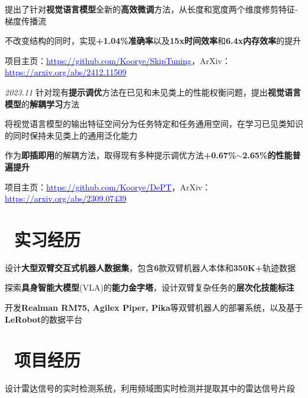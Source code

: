 \documentclass{resume}
\begin{document}
\faAngleRight 提出了针对\textbf{视觉语言模型}全新的\textbf{高效微调}方法，从长度和宽度两个维度修剪特征-梯度传播流

\faAngleRight 不改变结构的同时，实现\textbf{+1.04\%准确率}以及\textbf{15x时间效率}和\textbf{6.4x内存效率}的提升

\faAngleRight 项目主页：\href{https://github.com/Koorye/SkipTuning}{\textcolor{blue}{\sffamily https://github.com/Koorye/SkipTuning}}，ArXiv：\href{https://arxiv.org/abs/2412.11509}{\textcolor{blue}{\sffamily https://arxiv.org/abs/2412.11509}}

\vspace{5pt}
{\textit{2023.11}}
\faAngleRight 针对现有\textbf{提示调优}方法在已见和未见类上的性能权衡问题，提出\textbf{视觉语言模型}的\textbf{解耦学习}方法

\faAngleRight 将视觉语言模型的输出特征空间分为任务特定和任务通用空间，在学习已见类知识的同时保持未见类上的通用泛化能力

\faAngleRight 作为\textbf{即插即用}的解耦方法，取得现有多种提示调优方法\textbf{+0.67\%$\sim$2.65\%的性能普遍提升}

\faAngleRight 项目主页：\href{https://github.com/Koorye/DePT}{\textcolor{blue}{\sffamily https://github.com/Koorye/DePT}}，ArXiv：\href{https://arxiv.org/abs/2309.07439}{\textcolor{blue}{\sffamily https://arxiv.org/abs/2309.07439}}

\vspace{-2pt}
\section{\faCoffee\ 实习经历}

\faAngleRight 设计\textbf{大型双臂交互式机器人数据集}，包含\textbf{6}款双臂机器人本体和\textbf{350K+}轨迹数据

\faAngleRight 探索\textbf{具身智能大模型}(VLA)的\textbf{能力金字塔}，设计双臂复杂任务的\textbf{层次化技能标注}

\faAngleRight 开发\textbf{Realman RM75, Agilex Piper, Pika}等双臂机器人的部署系统，以及基于\textbf{LeRobot}的数据平台

\section{\faBriefcase\ 项目经历}
\faAngleRight 设计雷达信号的实时检测系统，利用频域图实时检测并提取其中的雷达信号片段
\end{document}
